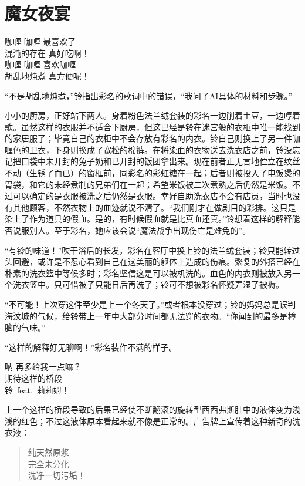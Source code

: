 \chapter{魔女夜宴}

\begin{song}
咖喱 咖喱 最喜欢了\\
混沌的存在 真好吃啊！\\
咖喱 咖喱 喜欢咖喱\\
胡乱地炖煮 真方便呢！
\end{song}

“不是胡乱地炖煮，”铃指出彩名的歌词中的错误，“我问了AI具体的材料和步骤。”

小小的厨房，正好站下两人。身着粉色法兰绒套装的彩名一边削着土豆，一边哼着歌。虽然这样的衣服并不适合下厨房，但这已经是铃在迷宫般的衣柜中唯一能找到的家居服了；毕竟自己的衣柜中不会存放有彩名的内衣。铃自己则换上了另一件咖喱色的卫衣，下身则换成了宽松的棉裤。在将染血的衣物送去洗衣店之前，铃没忘记把口袋中未开封的兔子奶和已开封的饭团拿出来。现在前者正无言地伫立在纹丝不动（生锈了而已）的窗框前，同彩名的彩虹糖在一起；后者则被投入了电饭煲的胃袋，和它的未经煮制的兄弟们在一起；希望米饭被二次煮熟之后仍然是米饭。不过可以确定的是衣服被洗之后仍然是衣服。幸好自助洗衣店不会有店员，当时也没有其他顾客，不然衣物上的血迹就说不清了。“我们刚才在做剧目的彩排。这只是染上了作为道具的假血。是的，有时候假血就是比真血还真。”铃想着这样的解释能否说服别人。至于彩名，她应该会说“魔法战争出现伤亡是难免的”。

“有铃的味道！”吹干浴后的长发，彩名在客厅中换上铃的法兰绒套装；铃只能转过头回避，或许是不忍心看到自己在这美丽的躯体上造成的伤痕。繁复的外搭已经在朴素的洗衣篮中等候多时；彩名坚信这是可以被机洗的。血色的内衣则被放入另一个洗衣篮中。只可惜被子只能日后再洗了；铃可不想被彩名怀疑弄湿了被褥。

“不可能！上次穿这件至少是上一个冬天了。”或者根本没穿过；铃的妈妈总是误判海汶城的气候，给铃带上一年中大部分时间都无法穿的衣物。“你闻到的最多是樟脑的气味。”

“这样的解释好无聊啊！”彩名装作不满的样子。
\begin{song}
呐 再多给我一点嘛？\\
期待这样的桥段\\
铃~feat.~莉莉姆！
\end{song}

上一个这样的桥段导致的后果已经使不断翻滚的旋转型西西弗斯肚中的液体变为浅浅的红色；不过这液体原本看起来就不像是正常的。广告牌上宣传着这种新奇的洗衣液：
\begin{quote}
\fullpercent 纯天然原浆\\
完全未分化\\
洗净一切污垢！
\end{quote}

